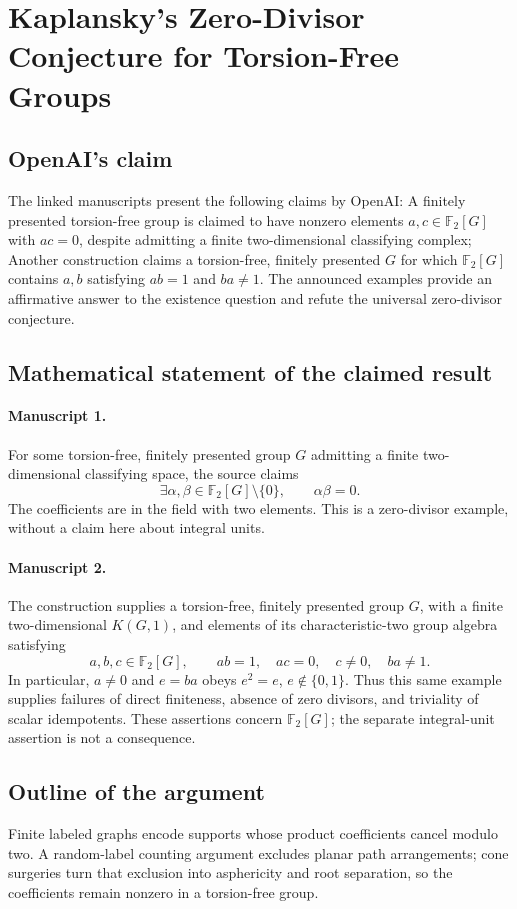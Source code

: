 \documentclass[11pt]{article}
\begin{document}
\section*{Kaplansky's Zero-Divisor Conjecture for Torsion-Free Groups}

\subsection{OpenAI's claim}
The linked manuscripts present the following claims by OpenAI: A finitely presented torsion-free group is claimed to have nonzero elements $a,c\in\mathbb F_2[G]$ with $ac=0$, despite admitting a finite two-dimensional classifying complex; Another construction claims a torsion-free, finitely presented $G$ for which $\mathbb F_2[G]$ contains $a,b$ satisfying $ab=1$ and $ba\ne1$. The announced examples provide an affirmative answer to the existence question and refute the universal zero-divisor conjecture.

\subsection{Mathematical statement of the claimed result}
\paragraph{Manuscript 1.}
For some torsion-free, finitely presented group \(G\) admitting a finite two-dimensional classifying space, the source claims
\[
 \exists\alpha,\beta\in\mathbb F_2[G]\setminus\{0\},\qquad\alpha\beta=0.
\]
The coefficients are in the field with two elements. This is a zero-divisor example, without a claim here about integral units.

\paragraph{Manuscript 2.}
The construction supplies a torsion-free, finitely presented group \(G\), with a finite two-dimensional \(K(G,1)\), and elements of its characteristic-two group algebra satisfying
\[
 a,b,c\in\mathbb F_2[G],\qquad ab=1,\quad ac=0,\quad c\ne0,\quad ba\ne1.
\]
In particular, \(a\ne0\) and \(e=ba\) obeys \(e^2=e\), \(e\notin\{0,1\}\). Thus this same example supplies failures of direct finiteness, absence of zero divisors, and triviality of scalar idempotents. These assertions concern \(\mathbb F_2[G]\); the separate integral-unit assertion is not a consequence.

\subsection{Outline of the argument}
Finite labeled graphs encode supports whose product coefficients cancel modulo two. A random-label counting argument excludes planar path arrangements; cone surgeries turn that exclusion into asphericity and root separation, so the coefficients remain nonzero in a torsion-free group.
\end{document}
